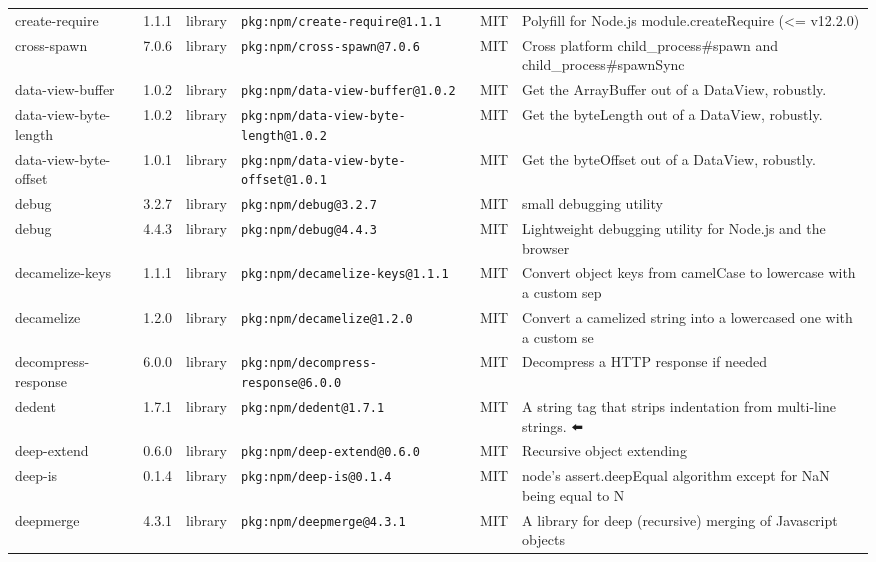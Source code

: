 \documentclass[11pt,a4paper]{article}
\begin{document}
\begin{longtable}{|p{4cm}|p{2cm}|p{1.6cm}|p{5cm}|p{1.5cm}|p{3.5cm}|}
\raggedright create-require & 1.1.1 & library & \small\texttt{pkg:npm/create-require@1.1.1} & MIT & \small Polyfill for Node.js module.createRequire (\textless{}= v12.2.0) \\
\raggedright cross-spawn & 7.0.6 & library & \small\texttt{pkg:npm/cross-spawn@7.0.6} & MIT & \small Cross platform child\_process\#spawn and child\_process\#spawnSync \\
\raggedright data-view-buffer & 1.0.2 & library & \small\texttt{pkg:npm/data-view-buffer@1.0.2} & MIT & \small Get the ArrayBuffer out of a DataView, robustly. \\
\raggedright data-view-byte-length & 1.0.2 & library & \small\texttt{pkg:npm/data-view-byte-length@1.0.2} & MIT & \small Get the byteLength out of a DataView, robustly. \\
\raggedright data-view-byte-offset & 1.0.1 & library & \small\texttt{pkg:npm/data-view-byte-offset@1.0.1} & MIT & \small Get the byteOffset out of a DataView, robustly. \\
\raggedright debug & 3.2.7 & library & \small\texttt{pkg:npm/debug@3.2.7} & MIT & \small small debugging utility \\
\raggedright debug & 4.4.3 & library & \small\texttt{pkg:npm/debug@4.4.3} & MIT & \small Lightweight debugging utility for Node.js and the browser \\
\raggedright decamelize-keys & 1.1.1 & library & \small\texttt{pkg:npm/decamelize-keys@1.1.1} & MIT & \small Convert object keys from camelCase to lowercase with a custom sep \\
\raggedright decamelize & 1.2.0 & library & \small\texttt{pkg:npm/decamelize@1.2.0} & MIT & \small Convert a camelized string into a lowercased one with a custom se \\
\raggedright decompress-response & 6.0.0 & library & \small\texttt{pkg:npm/decompress-response@6.0.0} & MIT & \small Decompress a HTTP response if needed \\
\raggedright dedent & 1.7.1 & library & \small\texttt{pkg:npm/dedent@1.7.1} & MIT & \small A string tag that strips indentation from multi-line strings. ⬅️ \\
\raggedright deep-extend & 0.6.0 & library & \small\texttt{pkg:npm/deep-extend@0.6.0} & MIT & \small Recursive object extending \\
\raggedright deep-is & 0.1.4 & library & \small\texttt{pkg:npm/deep-is@0.1.4} & MIT & \small node's assert.deepEqual algorithm except for NaN being equal to N \\
\raggedright deepmerge & 4.3.1 & library & \small\texttt{pkg:npm/deepmerge@4.3.1} & MIT & \small A library for deep (recursive) merging of Javascript objects \\

\end{longtable}
\end{document}
